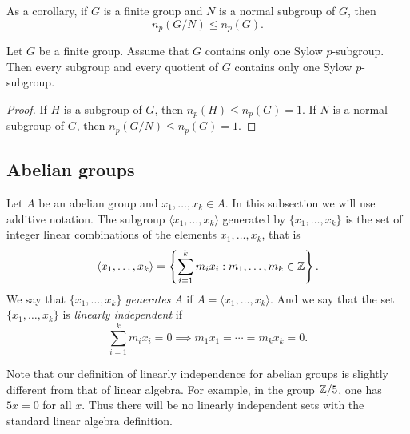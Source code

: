 As a corollary, if $G$ is a finite group and
$N$ is a normal subgroup of $G$, then 
\[
n_p(G/N)\leq n_p(G).
\]

\begin{optional}
\begin{corollary}
Let $G$ be a finite group. Assume that 
$G$ contains only one Sylow $p$-subgroup. Then
every subgroup and every quotient of 
$G$ 
contains only one Sylow 
$p$-subgroup. 
\end{corollary}

\begin{proof}
    If $H$ is a subgroup of $G$, then
    $n_p(H)\leq n_p(G)=1$. If $N$ is a normal subgroup of 
    $G$, then $n_p(G/N)\leq n_p(G)=1$.
\end{proof}    
\end{optional}

%
%

\subsection{Abelian groups}

Let $A$ be an abelian group and $x_1,\dots,x_k\in A$. In this subsection we will use additive notation.  
The subgroup $\langle x_1,\dots,x_k\rangle$ 
generated by $\{x_1,\dots,x_k\}$
is the set of integer linear combinations of the elements 
$x_1,\dots,x_k$, that is
\[ 
\langle x_1,\dots,x_k\rangle=\left\{ 
\sum_{i=1}^k m_ix_i: m_1,\dots,m_k\in\mathbb{Z}\right\}.
\]
We say that $\{x_1,\dots,x_k\}$ \emph{generates} $A$ if 
$A=\langle x_1,\dots,x_k\rangle$. And we say that the set 
$\{x_1,\dots,x_k\}$ is 
\emph{linearly independent} if 
\[
\sum_{i=1}^k m_ix_i=0\implies m_1x_1=\cdots=m_kx_k=0.
\]

Note that our definition of linearly independence for abelian groups is slightly 
different from that of linear algebra. For example, in the group $\mathbb{Z}/5$, 
one has $5x=0$ for all $x$. Thus there will be no linearly independent sets with 
the standard linear algebra definition. 

